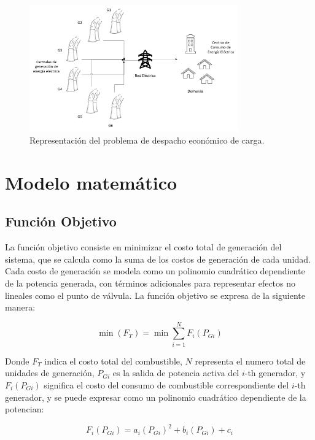 \documentclass[11pt]{article}
\begin{document}
\begin{figure}[h!]
    \centering
    \includegraphics[width=0.8\textwidth]{economic-dispatch.png}
    \caption{Representación del problema de despacho económico de carga.}
    \label{fig:economic_dispatch}
\end{figure}

\newpage
\section{Modelo matemático}
\subsection{Función Objetivo}

La función objetivo consiste en minimizar el costo total de generación del sistema, que se calcula como la suma de los costos de generación de cada unidad. Cada costo de generación se modela como un polinomio cuadrático dependiente de la potencia generada, con términos adicionales para representar efectos no lineales como el punto de válvula. La función objetivo se expresa de la siguiente manera:

\begin{equation}
    \min (F_T) =\min  \sum_{i=1}^{N} F_i(P_{Gi})
\end{equation}

Donde \( F_T \) indica el costo total del combustible, \( N \) representa el numero total de unidades de generación, 
\( P_{Gi} \) es la salida de potencia activa del \( i \)-th generador, y \( F_i(P_{Gi}) \) significa el costo del consumo 
de combustible correspondiente del \( i \)-th generador, y se puede expresar como un polinomio cuadrático dependiente de 
la potencian:

\begin{equation}
    F_i(P_{Gi}) = a_i(P_{Gi})^2 + b_i(P_{Gi}) + c_i
\end{equation}
\end{document}
